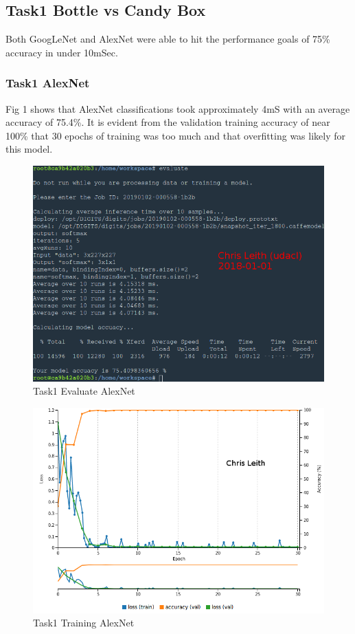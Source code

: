 \documentclass[10pt,journal,compsoc]{IEEEtran}
\begin{document}
\subsection{Task1 Bottle vs Candy Box}
Both GoogLeNet and AlexNet were able to hit the performance goals of 75\% accuracy in under 10mSec.

\subsubsection{Task1 AlexNet}
Fig 1 shows that AlexNet classifications took approximately 4mS with an average accuracy of 75.4\%. It is evident from the validation training accuracy of near 100\% that 30 epochs of training was too much and that overfitting was likely for this model. 

\begin{figure}[h]
      \centering
      \includegraphics[width=\linewidth]{Assets/screenshots/P1_Evaluate_Alex01_x1.png}
      \caption{Task1 Evaluate AlexNet }
      \label{fig:Task1 Evaluate AlexNet }
\end{figure}


\begin{figure}[h]
      \centering
      \includegraphics[width=\linewidth]{Assets/screenshots/Screenshot_2019-01-01_P1_alex1_30E.png}
      \caption{Task1 Training AlexNet}
      \label{fig:Task1 Training AlexNet}
\end{figure}
\end{document}

